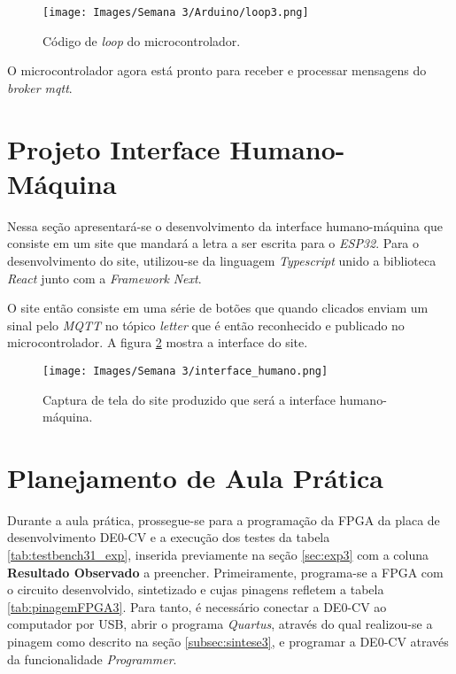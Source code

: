 \documentclass[amsmath,amssymb,floatfix]{report}
\begin{document}
\begin{figure}[H]
\centering
\texttt{[image: Images/Semana 3/Arduino/loop3.png]} 
    \caption{Código de \textit{loop} do microcontrolador.}
    \label{fig:loop3}
\end{figure}

O microcontrolador agora está pronto para receber e processar mensagens do \textit{broker mqtt}.

\section{Projeto Interface Humano-Máquina}
\label{sec:site3}

Nessa seção apresentará-se o desenvolvimento da interface humano-máquina que consiste em um site que mandará a letra a ser escrita para o \textit{ESP32}. Para o desenvolvimento do site, utilizou-se da linguagem \textit{Typescript} unido a biblioteca \textit{React} junto com a \textit{Framework} \textit{Next}.

O site então consiste em uma série de botões que quando clicados enviam um sinal pelo \textit{MQTT} no tópico \textit{letter} que é então reconhecido e publicado no microcontrolador. A figura \ref{fig:interface3} mostra a interface do site.

\begin{figure}[H]
\centering
\texttt{[image: Images/Semana 3/interface\_humano.png]} 
    \caption{Captura de tela do site produzido que será a interface humano-máquina.}
    \label{fig:interface3}
\end{figure}

\section{Planejamento de Aula Prática}

Durante a aula prática, prossegue-se para a programação da FPGA da placa de desenvolvimento DE0-CV e a execução dos testes da tabela \ref{tab:testbench31_exp}, inserida previamente na seção \ref{sec:exp3} com a coluna \textbf{Resultado Observado} a preencher. Primeiramente, programa-se a FPGA com o circuito desenvolvido, sintetizado e cujas pinagens refletem a tabela \ref{tab:pinagemFPGA3}. Para tanto, é necessário conectar a DE0-CV ao computador por USB, abrir o programa \textit{Quartus}, através do qual realizou-se a pinagem como descrito na seção \ref{subsec:sintese3}, e programar a DE0-CV através da funcionalidade \textit{Programmer}. 
\end{document}
